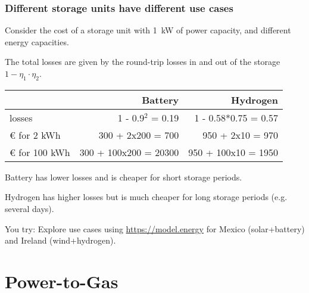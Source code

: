 \documentclass[10pt,aspectratio=169,dvipsnames]{beamer}
\newcommand{\ra}[1]{\renewcommand{\arraystretch}{#1}}
\begin{document}
\begin{frame}
  \frametitle{Different storage units have different use cases}

  Consider the cost of a storage unit with 1~kW of power capacity, and different energy capacities.

  The total losses are given by the \alert{round-trip losses} in and
  out of the storage $1- \eta_1\cdot \eta_2$.

  \ra{1.05}
  \begin{table}[!t]
    \begin{tabular}{lrr}
      \toprule
      & Battery & Hydrogen \\
      \midrule
      losses & 1 - 0.9$^2$ = 0.19 & 1 - 0.58*0.75 = 0.57 \\
      \euro{} for 2 kWh & 300 + 2x200 = 700 & 950 + 2x10 = 970 \\
      \euro{} for 100 kWh & 300 + 100x200 = 20300 & 950 + 100x10 = 1950 \\
      \bottomrule
    \end{tabular}
  \end{table}

  Battery has lower losses and is cheaper for short storage periods.

  Hydrogen has higher losses but is much cheaper for long storage periods (e.g. several days).


  \alert{You try}: Explore use cases using \url{https://model.energy} for Mexico (solar+battery) and Ireland (wind+hydrogen).
\end{frame}


\section{Power-to-Gas}
\end{document}
